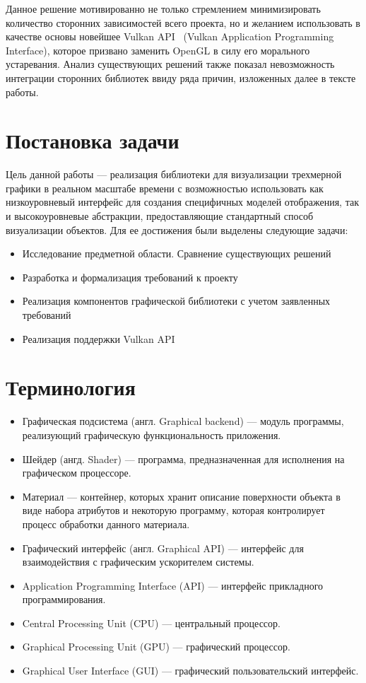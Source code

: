 \documentclass[14pt]{matmex-diploma}
\begin{document}
Данное решение мотивированно не только стремлением минимизировать количество сторонних зависимостей всего проекта, но и желанием использовать в качестве основы новейшее Vulkan API~\cite{spec:vulkan} (Vulkan Application Programming Interface), которое призвано заменить OpenGL в силу его морального устаревания. Анализ существующих решений также показал невозможность интеграции сторонних библиотек ввиду ряда причин, изложенных далее в тексте работы. 

\section{Постановка задачи}

Цель данной работы --- реализация библиотеки для визуализации трехмерной графики в реальном масштабе времени с возможностью использовать как низкоуровневый интерфейс для создания специфичных моделей отображения, так и высокоуровневые абстракции, предоставляющие стандартный способ визуализации объектов. Для ее достижения были выделены следующие задачи:

\begin{itemize}
    \item Исследование предметной области. Сравнение существующих решений
    \item Разработка и формализация требований к проекту
    \item Реализация компонентов графической библиотеки с учетом заявленных требований
    \item Реализация поддержки Vulkan API
\end{itemize}


\section{Терминология}

\begin{itemize}
    \item Графическая подсистема (англ. Graphical backend) --- модуль программы, реализующий графическую функциональность приложения.
    \item Шейдер (ангд. Shader) --- программа, предназначенная для исполнения на графическом процессоре.
    \item Материал --- контейнер, которых хранит описание поверхности объекта в виде набора атрибутов и некоторую программу, которая контролирует процесс обработки данного материала.
    \item Графический интерфейс (англ. Graphical API) --- интерфейс для взаимодействия с графическим ускорителем системы.
    \item Application Programming Interface (API) --- интерфейс прикладного программирования.
    \item Central Processing Unit (CPU) --- центральный процессор.
    \item Graphical Processing Unit (GPU) --- графический процессор.
    \item Graphical User Interface (GUI) --- графический пользовательский интерфейс.
\end{itemize}
\end{document}
